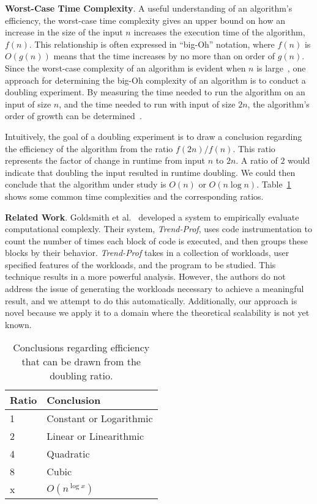 {\bf Worst-Case Time Complexity}. A useful understanding of an algorithm's efficiency, the worst-case time complexity
gives an upper bound on how an increase in the size of the input $n$ increases the execution time of the algorithm,
$f(n)$.  This relationship is often expressed in ``big-Oh'' notation, where $f(n)$ is $O(g(n))$ means that the time
increases by no more than on order of $g(n)$. Since the worst-case complexity of an algorithm is evident when $n$ is
large~\cite{goodrich2014}, one approach for determining the big-Oh complexity of an algorithm is to conduct a doubling
experiment. By measuring the time needed to run the algorithm on an input of size $n$, and the time needed to run with
input of size $2n$, the algorithm's order of growth can be determined~\cite{mcgeoch2012,sedgewick1998}.

Intuitively, the goal of a doubling experiment is to draw a conclusion regarding the efficiency of the algorithm from
the ratio $f(2n)/f(n)$. This ratio represents the factor of change in runtime from input $n$ to $2n$. A ratio of $2$
would indicate that doubling the input resulted in runtime doubling. We could then conclude that the algorithm under
study is $O(n)$ or $O(n\log n)$.  Table~\ref{table:ratios} shows some common time complexities and the corresponding
ratios.

{\bf Related Work}. Goldsmith et al.~\cite{Goldsmith2007} developed a system to empirically evaluate computational
complexly.  Their system, \textit{Trend-Prof}, uses code instrumentation to count the number of times each block of code
is executed, and then groups these blocks by their behavior.  \textit{Trend-Prof} takes in a collection of workloads,
user specified features of the workloads, and the program to be studied. This technique results in a more powerful
analysis. However, the authors do not address the issue of generating the workloads necessary to achieve a meaningful
result, and we attempt to do this automatically.  Additionally, our approach is novel because we apply it to a domain
where the theoretical scalability is not yet known.

\begin{table}[t]

  \begin{center}
    \begin{tabular}{l|l}
      Ratio & Conclusion              \\ \hline
      1     & Constant or Logarithmic \\
      2     & Linear or Linearithmic  \\
      4     & Quadratic               \\
      8     & Cubic                   \\
      x     & $O(n^{\log x})$
    \end{tabular}
  \end{center}
  \vspace*{-.15in}

  \caption{Conclusions regarding efficiency that can be drawn from the doubling ratio.}\label{table:ratios}
  \vspace*{-.30in}

\end{table}
